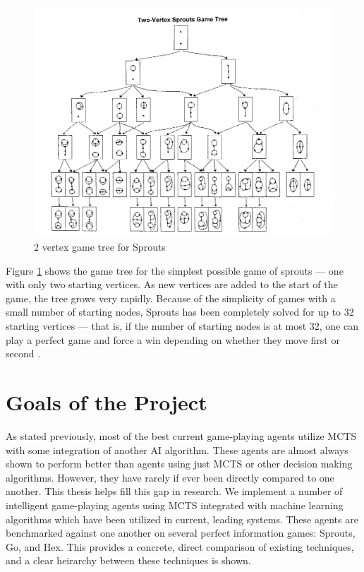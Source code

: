 \begin{figure}[h]
\centering
\includegraphics[scale=0.5]{images/sproutsgametree.jpg}
\caption{2 vertex game tree for Sprouts \cite{sproutstree}}
\label{ref:sprouts}
\end{figure}

Figure \ref{ref:sprouts} shows the game tree for the simplest possible game of sprouts --- one with only two starting vertices. As new vertices are added to the start of the game, the tree grows very rapidly.  Because of the simplicity of games with a small number of starting nodes, Sprouts has been completely solved for up to 32 starting vertices --- that is, if the number of starting nodes is at most 32, one can play a perfect game and force a win depending on whether they move first or second \cite{lemoine}.

\section{Goals of the Project}\label{sec:goals}
As stated previously, most of the best current game-playing agents utilize MCTS with some integration of another AI algorithm.  These agents are almost always shown to perform better than agents using just MCTS or other decision making algorithms.  However, they have rarely if ever been directly compared to one another.  This thesis helps fill this gap in research.  We implement a number of intelligent game-playing agents using MCTS integrated with machine learning algorithms which have been utilized in current, leading systems. These agents are benchmarked against one another on several perfect information games: Sprouts, Go, and Hex.  This provides a concrete, direct comparison of existing techniques, and a clear heirarchy between these techniques is shown.

